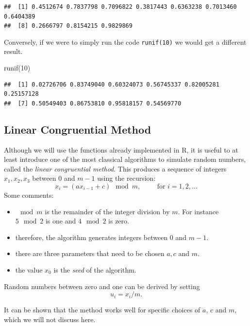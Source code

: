 \documentclass[
]{book}
\newenvironment{Shaded}{\begin{snugshade}}{\end{snugshade}}
\newcommand{\DecValTok}[1]{\textcolor[rgb]{0.00,0.00,0.81}{#1}}
\newcommand{\FunctionTok}[1]{\textcolor[rgb]{0.00,0.00,0.00}{#1}}
\newcommand{\NormalTok}[1]{#1}
\begin{document}
\begin{verbatim}
##  [1] 0.4512674 0.7837798 0.7096822 0.3817443 0.6363238 0.7013460 0.6404389
##  [8] 0.2666797 0.8154215 0.9829869
\end{verbatim}

Conversely, if we were to simply run the code \texttt{runif(10)} we would get a different result.

\begin{Shaded}
\begin{Highlighting}[]
\FunctionTok{runif}\NormalTok{(}\DecValTok{10}\NormalTok{)}
\end{Highlighting}
\end{Shaded}

\begin{verbatim}
##  [1] 0.02726706 0.83749040 0.60324073 0.56745337 0.82005281 0.25157128
##  [7] 0.50549403 0.86753810 0.95818157 0.54569770
\end{verbatim}

\hypertarget{linear-congruential-method}{%
\subsection{Linear Congruential Method}\label{linear-congruential-method}}

Although we will use the functions already implemented in R, it is useful to at least introduce one of the most classical algorithms to simulate random numbers, called the \emph{linear congruential method}.
This produces a sequence of integers \(x_1,x_2,x_3\) between 0 and \(m-1\) using the recursion:
\[
x_{i}=(ax_{i-1}+c)\mod m, \hspace{1cm} \mbox{for } i = 1,2,\dots
\]
Some comments:

\begin{itemize}
\item
  \(\mod m\) is the remainder of the integer division by \(m\). For instance \(5 \mod 2\) is one and \(4\mod 2\) is zero.
\item
  therefore, the algorithm generates integers between 0 and \(m-1\).
\item
  there are three parameters that need to be chosen \(a, c\) and \(m\).
\item
  the value \(x_0\) is the \emph{seed} of the algorithm.
\end{itemize}

Random numbers between zero and one can be derived by setting
\[
u_i= x_i/m.
\]

It can be shown that the method works well for specific choices of \(a\), \(c\) and \(m\), which we will not discuss here.
\end{document}
